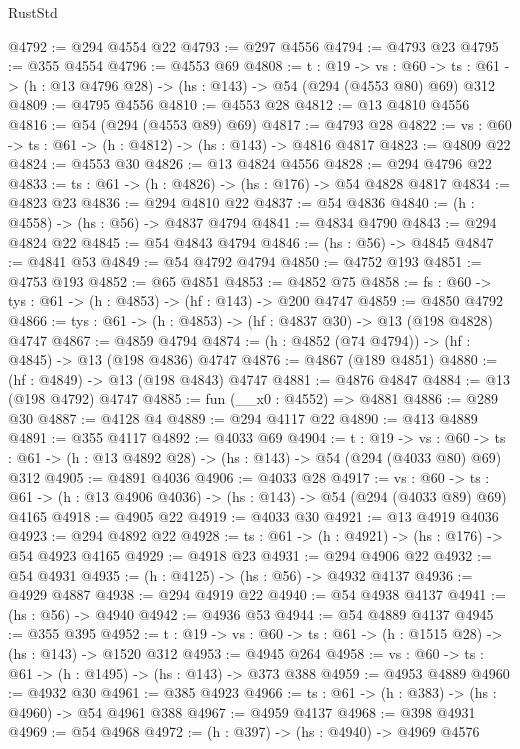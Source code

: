 \begin{lexlean}{RustStd}
\begin{coremodule}
@4792 := @294 @4554 @22
@4793 := @297 @4556
@4794 := @4793 @23
@4795 := @355 @4554
@4796 := @4553 @69
@4808 := {t : @19} ->
  {vs : @60} -> {ts : @61} -> (h : @13 @4796 @28) -> (hs : @143) -> @54 (@294 (@4553 @80) @69) @312
@4809 := @4795 @4556
@4810 := @4553 @28
@4812 := @13 @4810 @4556
@4816 := @54 (@294 (@4553 @89) @69)
@4817 := @4793 @28
@4822 := {vs : @60} -> {ts : @61} -> (h : @4812) -> (hs : @143) -> @4816 @4817
@4823 := @4809 @22
@4824 := @4553 @30
@4826 := @13 @4824 @4556
@4828 := @294 @4796 @22
@4833 := {ts : @61} -> (h : @4826) -> (hs : @176) -> @54 @4828 @4817
@4834 := @4823 @23
@4836 := @294 @4810 @22
@4837 := @54 @4836
@4840 := (h : @4558) -> (hs : @56) -> @4837 @4794
@4841 := @4834 @4790
@4843 := @294 @4824 @22
@4845 := @54 @4843 @4794
@4846 := (hs : @56) -> @4845
@4847 := @4841 @53
@4849 := @54 @4792 @4794
@4850 := @4752 @193
@4851 := @4753 @193
@4852 := @65 @4851
@4853 := @4852 @75
@4858 := {fs : @60} -> {tys : @61} -> (h : @4853) -> (hf : @143) -> @200 @4747
@4859 := @4850 @4792
@4866 := {tys : @61} -> (h : @4853) -> (hf : @4837 @30) -> @13 (@198 @4828) @4747
@4867 := @4859 @4794
@4874 := (h : @4852 (@74 @4794)) -> (hf : @4845) -> @13 (@198 @4836) @4747
@4876 := @4867 (@189 @4851)
@4880 := (hf : @4849) -> @13 (@198 @4843) @4747
@4881 := @4876 @4847
@4884 := @13 (@198 @4792) @4747
@4885 := fun (__x0 : @4552) => @4881
@4886 := @289 @30
@4887 := @4128 @4
@4889 := @294 @4117 @22
@4890 := @413 @4889
@4891 := @355 @4117
@4892 := @4033 @69
@4904 := {t : @19} ->
  {vs : @60} -> {ts : @61} -> (h : @13 @4892 @28) -> (hs : @143) -> @54 (@294 (@4033 @80) @69) @312
@4905 := @4891 @4036
@4906 := @4033 @28
@4917 := {vs : @60} ->
  {ts : @61} -> (h : @13 @4906 @4036) -> (hs : @143) -> @54 (@294 (@4033 @89) @69) @4165
@4918 := @4905 @22
@4919 := @4033 @30
@4921 := @13 @4919 @4036
@4923 := @294 @4892 @22
@4928 := {ts : @61} -> (h : @4921) -> (hs : @176) -> @54 @4923 @4165
@4929 := @4918 @23
@4931 := @294 @4906 @22
@4932 := @54 @4931
@4935 := (h : @4125) -> (hs : @56) -> @4932 @4137
@4936 := @4929 @4887
@4938 := @294 @4919 @22
@4940 := @54 @4938 @4137
@4941 := (hs : @56) -> @4940
@4942 := @4936 @53
@4944 := @54 @4889 @4137
@4945 := @355 @395
@4952 := {t : @19} -> {vs : @60} -> {ts : @61} -> (h : @1515 @28) -> (hs : @143) -> @1520 @312
@4953 := @4945 @264
@4958 := {vs : @60} -> {ts : @61} -> (h : @1495) -> (hs : @143) -> @373 @388
@4959 := @4953 @4889
@4960 := @4932 @30
@4961 := @385 @4923
@4966 := {ts : @61} -> (h : @383) -> (hs : @4960) -> @54 @4961 @388
@4967 := @4959 @4137
@4968 := @398 @4931
@4969 := @54 @4968
@4972 := (h : @397) -> (hs : @4940) -> @4969 @4576

\end{coremodule}
\end{lexlean}
